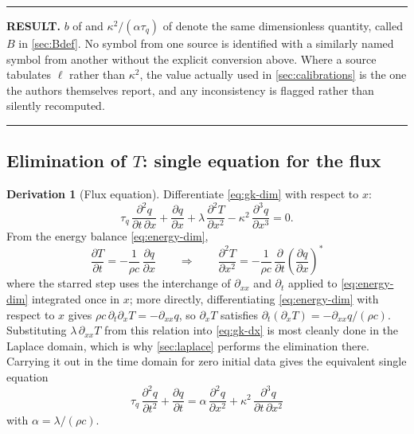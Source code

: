 \documentclass[11pt,a4paper]{article}
\theoremstyle{definition}
\newtheorem{derivationx}{Derivation}[section]
\newenvironment{resultbox}%
  {\par\medskip\noindent\begin{minipage}{\linewidth}%
   \rule{\linewidth}{1.0pt}\par\noindent\textbf{RESULT.}\enspace}%
  {\par\rule{\linewidth}{1.0pt}\end{minipage}\par\medskip}
\newcommand{\tq}{\tau_{q}}
\newcommand{\kk}{\kappa^{2}}
\newcommand{\Bnum}{B}
\begin{document}
\begin{resultbox}
$b$ of \cite{Van2017} and $\kk/(\alpha\tq)$ of \cite{FeherKovacs2021} denote the
same dimensionless quantity, called $\Bnum$ in \cref{sec:Bdef}. No symbol from
one source is identified with a similarly named symbol from another without the
explicit conversion above. Where a source tabulates $\ell$ rather than $\kk$,
the value actually used in \cref{sec:calibrations} is the one the authors
themselves report, and any inconsistency is flagged rather than silently
recomputed.
\end{resultbox}

\subsection{Elimination of \texorpdfstring{$T$}{T}: single equation for the flux}

\begin{derivationx}[Flux equation]
\label{der:fluxeq}
Differentiate \eqref{eq:gk-dim} with respect to $x$:
\begin{equation}
  \tq\,\frac{\partial^{2} q}{\partial t\,\partial x}
  + \frac{\partial q}{\partial x}
  + \lambda\,\frac{\partial^{2} T}{\partial x^{2}}
  - \kk\,\frac{\partial^{3} q}{\partial x^{3}} = 0 .
  \label{eq:gk-dx}
\end{equation}
From the energy balance \eqref{eq:energy-dim},
\begin{equation}
  \frac{\partial T}{\partial t} = -\frac{1}{\rho c}\,
    \frac{\partial q}{\partial x}
  \qquad\Longrightarrow\qquad
  \frac{\partial^{2} T}{\partial x^{2}}
    = -\frac{1}{\rho c}\,\frac{\partial}{\partial t}
      \!\left(\frac{\partial q}{\partial x}\right)^{\!\!*}
  \label{eq:Txx}
\end{equation}
where the starred step uses the interchange of $\partial_{xx}$ and
$\partial_{t}$ applied to \eqref{eq:energy-dim} integrated once in $x$; more
directly, differentiating \eqref{eq:energy-dim} with respect to $x$ gives
$\rho c\,\partial_{t}\partial_{x}T = -\partial_{xx}q$, so
$\partial_{x}T$ satisfies
$\partial_{t}(\partial_{x}T) = -\partial_{xx}q/(\rho c)$.
Substituting $\lambda\,\partial_{xx}T$ from this relation into
\eqref{eq:gk-dx} is most cleanly done in the Laplace domain, which is why
\cref{sec:laplace} performs the elimination there. Carrying it out in the time
domain for zero initial data gives the equivalent single equation
\begin{equation}
  \boxed{\ \tq\,\frac{\partial^{2} q}{\partial t^{2}}
        + \frac{\partial q}{\partial t}
        = \alpha\,\frac{\partial^{2} q}{\partial x^{2}}
        + \kk\,\frac{\partial^{3} q}{\partial t\,\partial x^{2}}\ }
  \label{eq:gk-flux-dim}
\end{equation}
with $\alpha=\lambda/(\rho c)$.
\end{derivationx}
\end{document}
